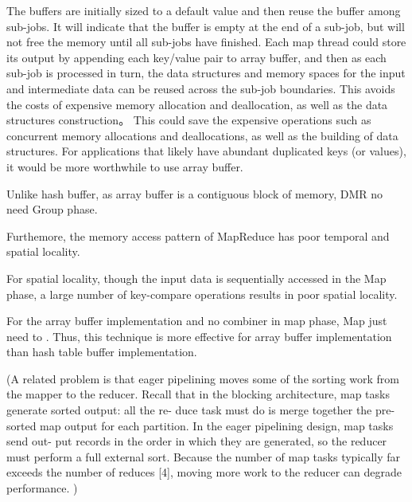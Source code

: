 
The buffers are initially sized to a default value 
and then reuse the buffer among sub-jobs.
It will indicate that the buffer is empty at the end of a sub-job, 
but will not free the memory until all sub-jobs have finished.
Each map thread could store its output by appending
each key/value pair to array buffer, 
and then as each sub-job is processed in turn,
the data structures and memory spaces 
for the input and intermediate data can be reused across the sub-job boundaries. 
This avoids the costs of expensive memory allocation and deallocation, 
as well as the data structures construction。
This could save the expensive operations such as
concurrent memory allocations and deallocations,
as well as the building of data structures.
For applications that likely have abundant duplicated keys (or values), 
it would be more worthwhile to use array buffer.

Unlike hash buffer, as array buffer is a contiguous block of memory, 
DMR no need Group phase.

Furthemore, the memory access pattern of MapReduce
has poor temporal and spatial locality.%

For spatial locality, 
though the input data is sequentially accessed in the Map phase,
a large number of key-compare operations results in poor spatial locality. 


For the array buffer implementation and no combiner in map phase,
Map just need to . Thus, this technique is more effective
for array buffer implementation than hash table buffer
implementation.

(A related problem is that eager pipelining moves some of the
sorting work from the mapper to the reducer.
Recall that in the
blocking architecture, map tasks generate sorted output: all the re-
duce task must do is merge together the pre-sorted map output for
each partition. In the eager pipelining design, map tasks send out-
put records in the order in which they are generated, so the reducer
must perform a full external sort. Because the number of map tasks
typically far exceeds the number of reduces [4], moving more work
to the reducer can degrade performance.
)




